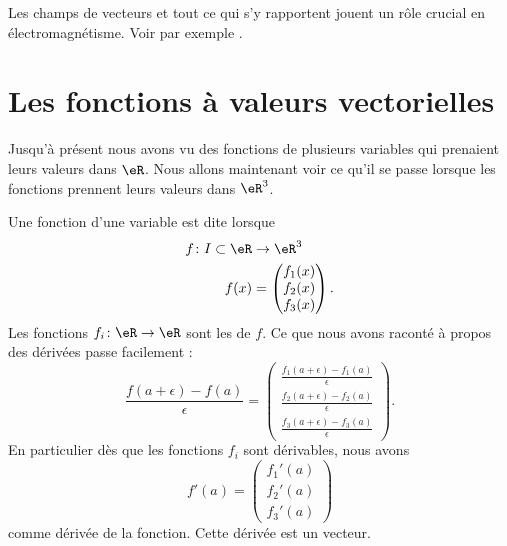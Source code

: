 Les champs de vecteurs et tout ce qui s'y rapportent jouent un rôle crucial en électromagnétisme. Voir par exemple \cite{Schomblond_em}.

\section{Les fonctions à valeurs vectorielles}

Jusqu'à présent nous avons vu des fonctions de plusieurs variables qui prenaient leurs valeurs dans $\eR$. Nous allons maintenant voir ce qu'il se passe lorsque les fonctions prennent leurs valeurs dans $\eR^3$.

Une fonction d'une variable est dite  lorsque
\begin{equation}
    \begin{aligned}
        f\colon I\subset \eR&\to \eR^3 \\
        f(x)&=\begin{pmatrix}
            f_1(x)    \\ 
            f_2(x)    \\ 
            f_3(x)    
        \end{pmatrix}.
    \end{aligned}
\end{equation}
Les fonctions $f_i\colon \eR\to \eR$ sont les  de $f$. Ce que nous avons raconté à propos des dérivées passe facilement :
\begin{equation}
    \frac{ f(a+\epsilon)-f(a) }{ \epsilon }=
    \begin{pmatrix}
        \frac{ f_1(a+\epsilon)-f_1(a) }{ \epsilon }    \\ 
        \frac{ f_2(a+\epsilon)-f_2(a) }{ \epsilon }    \\ 
        \frac{ f_3(a+\epsilon)-f_3(a) }{ \epsilon }    
    \end{pmatrix}.
\end{equation}
En particulier dès que les fonctions $f_i$ sont dérivables, nous avons
\begin{equation}
    f'(a)=\begin{pmatrix}
        f_1'(a)    \\ 
        f_2'(a)    \\ 
        f_3'(a)    
    \end{pmatrix}
\end{equation}
comme dérivée de la fonction. Cette dérivée est un vecteur.

